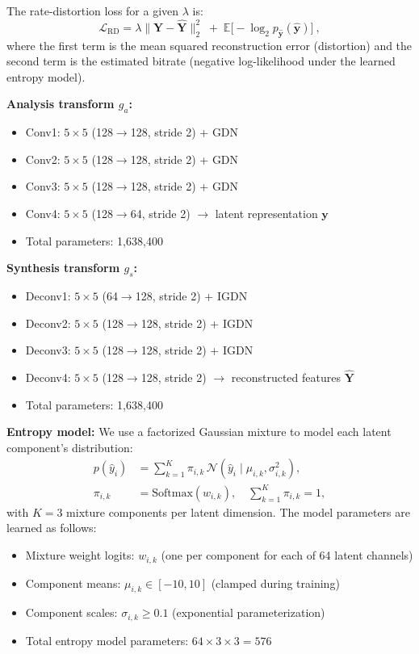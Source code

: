 \documentclass[conference]{IEEEtran}
\begin{document}
The rate-distortion loss for a given $\lambda$ is:
\begin{equation}
\mathcal{L}_{\text{RD}} = \lambda \|\mathbf{Y} - \hat{\mathbf{Y}}\|_2^2 \;+\; \mathbb{E}\big[-\log_2 p_{\hat{\mathbf{y}}}(\hat{\mathbf{y}})\big]~,
\end{equation}
where the first term is the mean squared reconstruction error (distortion) and the second term is the estimated bitrate (negative log-likelihood under the learned entropy model).

\textbf{Analysis transform $g_a$:}
\begin{itemize}
\item Conv1: $5\times 5$ (128$\to$128, stride 2) + GDN 
\item Conv2: $5\times 5$ (128$\to$128, stride 2) + GDN
\item Conv3: $5\times 5$ (128$\to$128, stride 2) + GDN  
\item Conv4: $5\times 5$ (128$\to$64, stride 2) $\to$ latent representation $\mathbf{y}$
\item Total parameters: 1,638,400
\end{itemize}

\textbf{Synthesis transform $g_s$:}
\begin{itemize}
\item Deconv1: $5\times 5$ (64$\to$128, stride 2) + IGDN
\item Deconv2: $5\times 5$ (128$\to$128, stride 2) + IGDN
\item Deconv3: $5\times 5$ (128$\to$128, stride 2) + IGDN
\item Deconv4: $5\times 5$ (128$\to$128, stride 2) $\to$ reconstructed features $\hat{\mathbf{Y}}$
\item Total parameters: 1,638,400
\end{itemize}

\textbf{Entropy model:}
We use a factorized Gaussian mixture to model each latent component's distribution:
\begin{align}
p(\hat{y}_i) &= \sum_{k=1}^{K} \pi_{i,k}\, \mathcal{N}(\hat{y}_i \mid \mu_{i,k}, \sigma^2_{i,k}), \\
\pi_{i,k} &= \text{Softmax}(w_{i,k}), \quad \sum_{k=1}^{K}\pi_{i,k}=1,
\end{align}
with $K=3$ mixture components per latent dimension. The model parameters are learned as follows:
\begin{itemize}
\item Mixture weight logits: $w_{i,k}$ (one per component for each of 64 latent channels)
\item Component means: $\mu_{i,k} \in [-10, 10]$ (clamped during training)
\item Component scales: $\sigma_{i,k} \ge 0.1$ (exponential parameterization)
\item Total entropy model parameters: $64 \times 3 \times 3 = 576$
\end{itemize}
\end{document}
